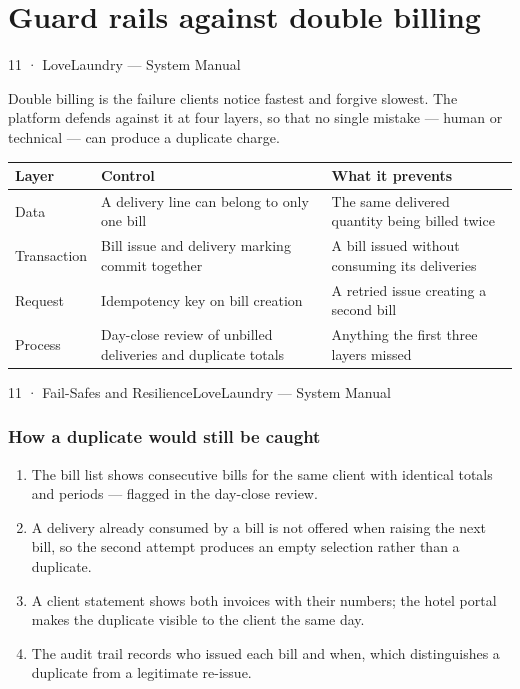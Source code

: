 \documentclass[11pt,a4paper,oneside]{book}
\begin{document}
\section*{Guard rails against double billing}
11 · LoveLaundry — System Manual

Double billing is the failure clients notice fastest and forgive slowest. The platform defends against it at four layers, so that no single mistake — human or technical — can produce a duplicate charge.

\begin{center}\small
\begin{tabularx}{\linewidth}{|X|X|X|}
\hline
\rowcolor{lightgrey}
\textbf{Layer} & \textbf{Control} & \textbf{What it prevents} \\ \hline
Data & A delivery line can belong to only one bill & The same delivered quantity being billed twice \\ \hline
Transaction & Bill issue and delivery marking commit together & A bill issued without consuming its deliveries \\ \hline
Request & Idempotency key on bill creation & A retried issue creating a second bill \\ \hline
Process & Day-close review of unbilled deliveries and duplicate totals & Anything the first three layers missed \\ \hline
\end{tabularx}
\end{center}
11 · Fail-Safes and ResilienceLoveLaundry — System Manual

\subsubsection*{How a duplicate would still be caught}
\begin{enumerate}
\item The bill list shows consecutive bills for the same client with identical totals and periods — flagged in the day-close review.
\item A delivery already consumed by a bill is not offered when raising the next bill, so the second attempt produces an empty selection rather than a duplicate.
\item A client statement shows both invoices with their numbers; the hotel portal makes the duplicate visible to the client the same day.
\item The audit trail records who issued each bill and when, which distinguishes a duplicate from a legitimate re-issue.
\end{enumerate}
\end{document}
